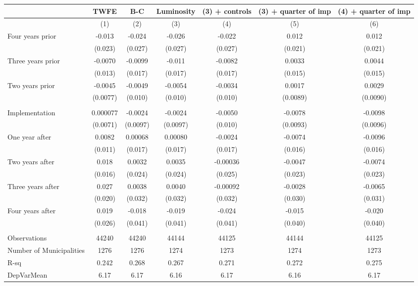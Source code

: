 \begin{tabular}{lcccccc}
\toprule
      & TWFE  & B-C   & Luminosity & (3) + controls & (3) + quarter of imp & (4) + quarter of imp \\
\midrule
      & (1)   & (2)   & (3)   & (4)   & (5)   & (6) \\
\midrule
\midrule
Four years prior & -0.013 & -0.024 & -0.026 & -0.022 & 0.012 & 0.012 \\
      & (0.023) & (0.027) & (0.027) & (0.027) & (0.021) & (0.021) \\
Three years prior & -0.0070 & -0.0099 & -0.011 & -0.0082 & 0.0033 & 0.0044 \\
      & (0.013) & (0.017) & (0.017) & (0.017) & (0.015) & (0.015) \\
Two years prior & -0.0045 & -0.0049 & -0.0054 & -0.0034 & 0.0017 & 0.0029 \\
      & (0.0077) & (0.010) & (0.010) & (0.010) & (0.0089) & (0.0090) \\
      &       &       &       &       &       &  \\
Implementation & 0.000077 & -0.0024 & -0.0024 & -0.0050 & -0.0078 & -0.0098 \\
      & (0.0071) & (0.0097) & (0.0097) & (0.010) & (0.0093) & (0.0096) \\
One year after & 0.0082 & 0.00068 & 0.00080 & -0.0024 & -0.0074 & -0.0096 \\
      & (0.011) & (0.017) & (0.017) & (0.017) & (0.016) & (0.016) \\
Two years after & 0.018 & 0.0032 & 0.0035 & -0.00036 & -0.0047 & -0.0074 \\
      & (0.016) & (0.024) & (0.024) & (0.025) & (0.023) & (0.023) \\
Three years after & 0.027 & 0.0038 & 0.0040 & -0.00092 & -0.0028 & -0.0065 \\
      & (0.020) & (0.032) & (0.032) & (0.032) & (0.030) & (0.031) \\
Four years after & 0.019 & -0.018 & -0.019 & -0.024 & -0.015 & -0.020 \\
      & (0.026) & (0.041) & (0.041) & (0.041) & (0.040) & (0.040) \\
      &       &       &       &       &       &  \\
\midrule
Observations & 44240 & 44240 & 44144 & 44125 & 44144 & 44125 \\
Number of Municipalities & 1276  & 1276  & 1274  & 1273  & 1274  & 1273 \\
R-sq  & 0.242 & 0.268 & 0.267 & 0.271 & 0.272 & 0.275 \\
DepVarMean & 6.17  & 6.17  & 6.16  & 6.17  & 6.16  & 6.17 \\
\bottomrule
\bottomrule
\end{tabular}%
